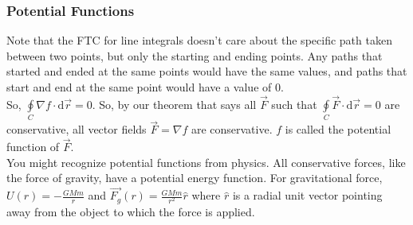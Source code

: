 \subsubsection{Potential Functions}
\noindent
Note that the FTC for line integrals doesn't care about the specific path taken between two points, but only the starting and ending points. Any paths that started and ended at the same points would have the same values, and paths that start and end at the same point would have a value of 0.\\
So, $\oint\limits_{C}{\nabla f\cdot\mathrm{d}\vec{r}}=0$. So, by our theorem that says all $\vec{F}$ such that $\oint\limits_{C}{\vec{F}\cdot\mathrm{d}\vec{r}}=0$ are conservative, all vector fields $\vec{F}=\nabla f$ are conservative. $f$ is called the potential function of $\vec{F}$.\\

\noindent
You might recognize potential functions from physics. All conservative forces, like the force of gravity, have a potential energy function. For gravitational force, $U(r)=-\frac{GMm}{r}$ and $\vec{F_g}(r)=\frac{GMm}{r^2}\hat{r}$ where $\hat{r}$ is a radial unit vector pointing away from the object to which the force is applied.